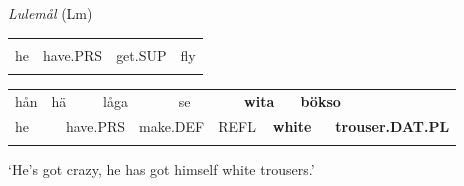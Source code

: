 \begin{listWWNumileveli}
\item 

\begin{styleExample}
\textit{Lulemål} (Lm)

\end{styleExample}

\end{listWWNumileveli}

\begin{listWWNumxliileveli}
\item 

\end{listWWNumxliileveli}

\begin{tabular}{llll}
\lsptoprule
\multicolumn{4}{l}{Hån

}\\
he & have.PRS & get.SUP & fly\\
\lspbottomrule
\end{tabular}

\begin{tabular}{llllllllllll}
\lsptoprule
hån & \multicolumn{2}{l}{hä

} & \multicolumn{2}{l}{låga

} & \multicolumn{2}{l}{se

} & \multicolumn{2}{l}{{\bfseries wita}

} & \multicolumn{2}{l}{{\bfseries bökso}

} & \\
\multicolumn{2}{l}{he

} & \multicolumn{2}{l}{have.PRS

} & \multicolumn{2}{l}{make.DEF

} & \multicolumn{2}{l}{REFL

} & \multicolumn{2}{l}{{\bfseries white}

} & \multicolumn{2}{l}{{\bfseries trouser.DAT.PL}

}\\
\lspbottomrule
\end{tabular}

\begin{styleTranslation}
‘He’s got crazy, he has got himself white trousers.’

\end{styleTranslation}

